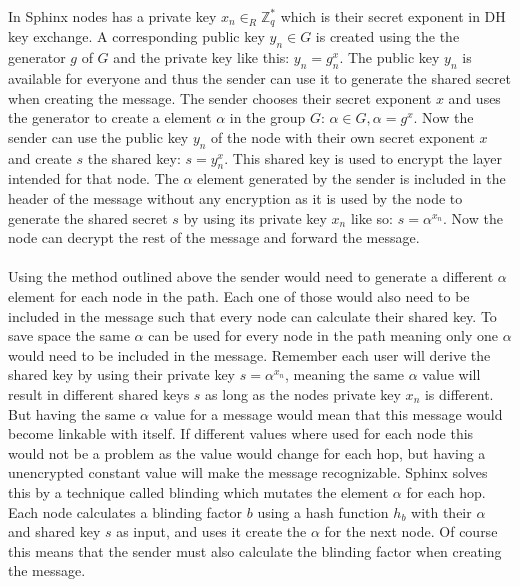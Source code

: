 \documentclass[informationsecurity]{gucmasterproject}
\begin{document}
\noindent In Sphinx \cite{danezis2009sphinx} nodes has a private key $x_{n} \in_R \mathbb{Z}_q^*$ which is their secret exponent in DH key exchange. A corresponding public key $y_{n} \in G$ is created using the the generator $g$ of $G$ and the private key like this: $y_{n} = g^x_{n}$. The public key $y_{n}$ is available for everyone and thus the sender can use it to generate the shared secret when creating the message. The sender chooses their secret exponent $x$ and uses the generator to create a element $\alpha$ in the group $G$:
$\alpha \in G, \alpha = g^x$. Now the sender can use the public key $y_{n}$ of the node with their own secret exponent $x$ and create $s$ the shared key: $s = y_{n}^x$. This shared key is used to encrypt the layer intended for that node. The $\alpha$ element generated by the sender is included in the header of the message without any encryption as it is used by the node to generate the shared secret $s$ by using its private key $x_n$ like so: $s = \alpha^{x_n}$. Now the node can decrypt the rest of the message and forward the message.

\paragraph{}
Using the method outlined above the sender would need to generate a different $\alpha$ element for each node in the path.
Each one of those would also need to be included in the message such that every node can calculate their shared key.
To save space the same $\alpha$ can be used for every node in the path meaning only one $\alpha$ would need to be included in the message. Remember each user will derive the shared key by using their private key $s = \alpha^{x_n}$, meaning the same $\alpha$ value will result in different shared keys $s$ as long as the nodes private key $x_n$ is different. But having the same $\alpha$ value for a message would mean that this message would become linkable with itself. If different values where used for each node this would not be a problem as the value would change for each hop, but having a unencrypted constant value will make the message recognizable. Sphinx solves this by a technique called blinding which mutates the element $\alpha$ for each hop. Each node calculates a blinding factor $b$ using a hash function $h_b$ with their $\alpha$ and shared key $s$ as input, and uses it create the $\alpha$ for the next node. Of course this means that the sender must also calculate the blinding factor when creating the message.
\end{document}
